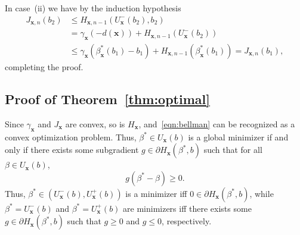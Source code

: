\documentclass[journal]{IEEEtran}
\newcommand{\bfx}{\boldsymbol x}
\newcommand{\Uright}{U_{\bfx}^+(b)}
\newcommand{\Uleft}{U_{\bfx}^-(b)}
\newcommand\1{\mathbf{1}}
\begin{document}
\begin{IEEEproof}
In case~(ii) we have by the induction hypothesis
\begin{align*}
J_{\bfx,n}(b_2) &\le H_{\bfx,n-1}(U^-_{\bfx}(b_2),b_2)\\
&= \gamma_{\bfx}(-d(\bfx)) + H_{\bfx,n-1}(U_{\bfx}^-(b_2))\\
&\le \gamma_{\bfx}(\beta_{\bfx}^*(b_1) - b_1) + H_{\bfx,n-1}(\beta_{\bfx}^*(b_1)) = J_{\bfx,n}(b_1),
\end{align*}
completing the proof.
\end{IEEEproof}

\subsection{Proof of Theorem~\ref{thm:optimal}}\label{sec:proof_theorem}
\begin{IEEEproof}
Since $\gamma_{\bfx}$ and $J_{\bfx}$ are convex, so is $H_{\bfx}$, and~\eqref{eqn:bellman} can be recognized as a convex optimization problem. Thus, $\beta^* \in U_{\bfx}(b)$ is a global minimizer if and only if there exists some subgradient $g \in \partial H_{\bfx}(\beta^*,b)$ such that for all $\beta \in U_{\bfx}(b)$,
\begin{equation*}
g(\beta^* - \beta) \ge 0.
\end{equation*}
Thus, $\beta^* \in (\Uleft,\Uright)$ is a minimizer iff $0 \in \partial H_{\bfx}(\beta^*,b)$, while $\beta^* = \Uleft$ and $\beta^* = \Uright$ are minimizers iff there exists some $g \in \partial H_{\bfx}(\beta^*,b)$ such that $g \ge 0$ and $g \le 0$, respectively.


\end{IEEEproof}
\end{document}

